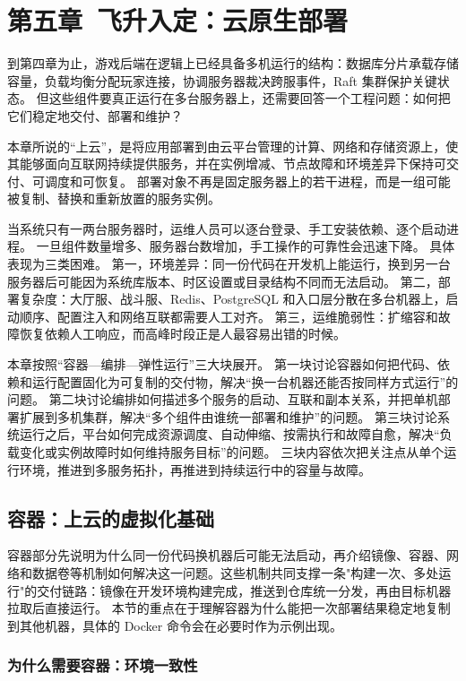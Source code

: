 \section{第五章\ 飞升入定：云原生部署}\label{sec:chapter5}

到第四章为止，游戏后端在逻辑上已经具备多机运行的结构：数据库分片承载存储容量，负载均衡分配玩家连接，协调服务器裁决跨服事件，Raft 集群保护关键状态。
但这些组件要真正运行在多台服务器上，还需要回答一个工程问题：如何把它们稳定地交付、部署和维护？

本章所说的“上云”，是将应用部署到由云平台管理的计算、网络和存储资源上，使其能够面向互联网持续提供服务，并在实例增减、节点故障和环境差异下保持可交付、可调度和可恢复。
部署对象不再是固定服务器上的若干进程，而是一组可能被复制、替换和重新放置的服务实例。

当系统只有一两台服务器时，运维人员可以逐台登录、手工安装依赖、逐个启动进程。
一旦组件数量增多、服务器台数增加，手工操作的可靠性会迅速下降。
具体表现为三类困难。
第一，环境差异：同一份代码在开发机上能运行，换到另一台服务器后可能因为系统库版本、时区设置或目录结构不同而无法启动。
第二，部署复杂度：大厅服、战斗服、Redis、PostgreSQL 和入口层分散在多台机器上，启动顺序、配置注入和网络互联都需要人工对齐。
第三，运维脆弱性：扩缩容和故障恢复依赖人工响应，而高峰时段正是人最容易出错的时候。

本章按照“容器—编排—弹性运行”三大块展开。
第一块讨论容器如何把代码、依赖和运行配置固化为可复制的交付物，解决“换一台机器还能否按同样方式运行”的问题。
第二块讨论编排如何描述多个服务的启动、互联和副本关系，并把单机部署扩展到多机集群，解决“多个组件由谁统一部署和维护”的问题。
第三块讨论系统运行之后，平台如何完成资源调度、自动伸缩、按需执行和故障自愈，解决“负载变化或实例故障时如何维持服务目标”的问题。
三块内容依次把关注点从单个运行环境，推进到多服务拓扑，再推进到持续运行中的容量与故障。

\subsection{容器：上云的虚拟化基础}\label{sec5:containers}

容器部分先说明为什么同一份代码换机器后可能无法启动，再介绍镜像、容器、网络和数据卷等机制如何解决这一问题。这些机制共同支撑一条"构建一次、多处运行"的交付链路：镜像在开发环境构建完成，推送到仓库统一分发，再由目标机器拉取后直接运行。
本节的重点在于理解容器为什么能把一次部署结果稳定地复制到其他机器，具体的 Docker 命令会在必要时作为示例出现。

\subsubsection{为什么需要容器：环境一致性}\label{sec5:environment-problem}

